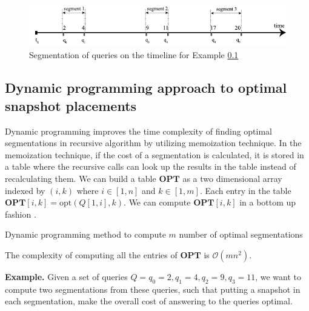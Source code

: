 \begin{figure}
	\label{fig:example_recursive_segmentation}
	\centering
	\includegraphics[width=\textwidth]{figs/example_recursive_s.pdf}
	\caption{Segmentation of queries on the timeline for Example \ref{}}
\end{figure}


\subsection{Dynamic programming approach to optimal snapshot placements}

Dynamic programming improves the time complexity of finding optimal segmentations in recursive algorithm by utilizing memoization technique. In the memoization technique, if the cost of a segmentation is calculated, it is stored in a table where the recursive calls can look up the results in the table instead of recalculating them. We can build a table $\mathbf{OPT}$ as a two dimensional array
indexed by $(i, k)$ where $i\in [1, n]$ and $k\in [1, m]$.  Each entry
in the table $\mathbf{OPT}[i,k] = \mathrm{opt}(Q[1,i], k)$.
We can compute $\mathbf{OPT}[i,k]$ in a bottom up fashion \cite{}.

\begin{algorithm}[H]
\SetAlgoLined
\caption{Dynamic programming method to compute $m$ number of optimal segmentations}
\label{alg:dynamic_programming}
\DontPrintSemicolon
 
\end{algorithm}

The complexity of computing all the entries of $\mathbf{OPT}$ is $\mathcal{O}(mn^2)$.

\textbf{Example.} Given a set of queries $Q={q_0=2,q_1=4,q_2=9,q_3=11}$, we want to compute two segmentations from these queries, such that putting a snapshot in each segmentation, make the overall cost of answering to the queries optimal.

